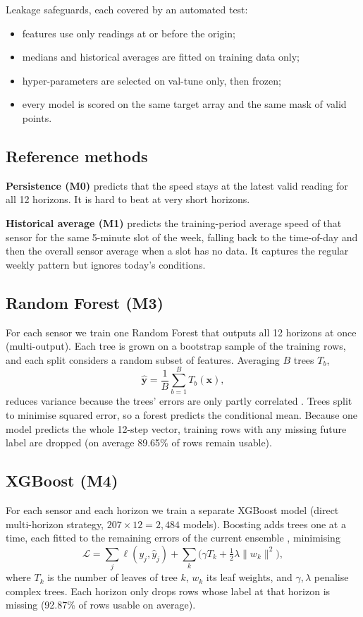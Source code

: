 \documentclass[conference]{IEEEtran}
\begin{document}
Leakage safeguards, each covered by an automated test:
\begin{itemize}
\item features use only readings at or before the origin;
\item medians and historical averages are fitted on training data only;
\item hyper-parameters are selected on val-tune only, then frozen;
\item every model is scored on the same target array and the same mask of valid points.
\end{itemize}

\subsection{Reference methods}
\textbf{Persistence (M0)} predicts that the speed stays at the latest valid reading for all 12 horizons. It is hard to beat at very short horizons.

\textbf{Historical average (M1)} predicts the training-period average speed of that sensor for the same 5-minute slot of the week, falling back to the time-of-day and then the overall sensor average when a slot has no data. It captures the regular weekly pattern but ignores today's conditions.

\subsection{Random Forest (M3)}
For each sensor we train one Random Forest that outputs all 12 horizons at once (multi-output). Each tree is grown on a bootstrap sample of the training rows, and each split considers a random subset of features. Averaging $B$ trees $T_b$,
\begin{equation}
\hat{\mathbf y}=\frac1B\sum_{b=1}^{B}T_b(\mathbf x),
\end{equation}
reduces variance because the trees' errors are only partly correlated \cite{breiman}. Trees split to minimise squared error, so a forest predicts the conditional mean. Because one model predicts the whole 12-step vector, training rows with any missing future label are dropped (on average 89.65\% of rows remain usable).

\subsection{XGBoost (M4)}
For each sensor and each horizon we train a separate XGBoost model (direct multi-horizon strategy, $207\times12=2{,}484$ models). Boosting adds trees one at a time, each fitted to the remaining errors of the current ensemble \cite{chen}, minimising
\begin{equation}
\mathcal L=\sum_{j}\ell(y_j,\hat y_j)+\sum_{k}\Big(\gamma T_k+\tfrac12\lambda\lVert w_k\rVert^2\Big),
\end{equation}
where $T_k$ is the number of leaves of tree $k$, $w_k$ its leaf weights, and $\gamma,\lambda$ penalise complex trees. Each horizon only drops rows whose label at that horizon is missing (92.87\% of rows usable on average).
\end{document}
